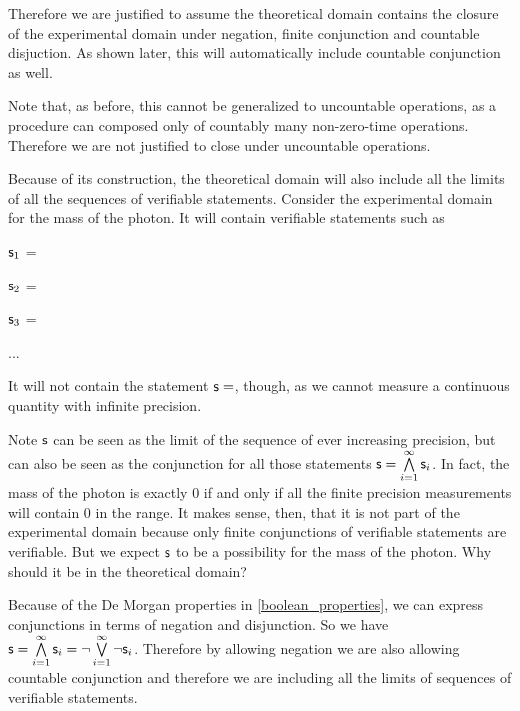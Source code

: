 \documentclass[11pt,letterpaper,fleqn]{memoir} %
\begin{document}
\begin{mathSection}
\begin{justification}
	Therefore we are justified to assume the theoretical domain contains the closure of the experimental domain under negation, finite conjunction and countable disjuction. As shown later, this will automatically include countable conjunction as well.
	
	Note that, as before, this cannot be generalized to uncountable operations, as a procedure can composed only of countably many non-zero-time operations. Therefore we are not justified to close under uncountable operations.
\end{justification}
\end{mathSection}

Because of its construction, the theoretical domain will also include all the limits of all the sequences of verifiable statements. Consider the experimental domain for the mass of the photon. It will contain verifiable statements such as
\begin{description}
	\item $\mathsf{s}_1$ =
	\item $\mathsf{s}_2$ =
	\item $\mathsf{s}_3$ =
	\item ...
\end{description}
It will not contain the statement $\mathsf{s}=$, though, as we cannot measure a continuous quantity with infinite precision.

Note $\mathsf{s}$ can be seen as the limit of the sequence of ever increasing precision, but can also be seen as the conjunction for all those statements $\mathsf{s}=\bigwedge\limits_{i=1}^{\infty} \mathsf{s}_i$. In fact, the mass of the photon is exactly 0 if and only if all the finite precision measurements will contain 0 in the range. It makes sense, then, that it is not part of the experimental domain because only finite conjunctions of verifiable statements are verifiable. But we expect $\mathsf{s}$ to be a possibility for the mass of the photon. Why should it be in the theoretical domain?

Because of the De Morgan properties in \ref{boolean_properties}, we can express conjunctions in terms of negation and disjunction. So we have $\mathsf{s}=\bigwedge\limits_{i=1}^{\infty} \mathsf{s}_i=\neg \bigvee\limits_{i=1}^{\infty} \neg\mathsf{s}_i$. Therefore by allowing negation we are also allowing countable conjunction and therefore we are including all the limits of sequences of verifiable statements.
\end{document}
